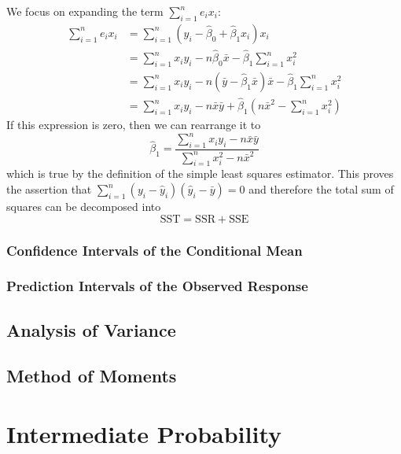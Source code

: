 \documentclass[11pt]{report} %
\begin{document}
We focus on expanding the term $\sum_{i=1}^{n}e_{i}x_{i}$:
\begin{align}
\sum_{i=1}^{n}e_{i}x_{i} &= \sum_{i=1}^{n}\left(y_{i}-\widehat{\beta}_{0}+\widehat{\beta}_{1}x_{i}\right)x_{i} \\
&= \sum_{i=1}^{n}x_{i}y_{i}-n\widehat{\beta}_{0}\bar{x}-\widehat{\beta}_{1}\sum_{i=1}^{n}x_{i}^{2} \\
&= \sum_{i=1}^{n}x_{i}y_{i}-n\left(\bar{y}-\widehat{\beta}_{1}\bar{x}\right)\bar{x}-\widehat{\beta}_{1}\sum_{i=1}^{n}x_{i}^{2} \\
&= \sum_{i=1}^{n}x_{i}y_{i}-n\bar{x}\bar{y}+\widehat{\beta}_{1}\left(n\bar{x}^{2}-\sum_{i=1}^{n}x_{i}^{2}\right)
\end{align}
If this expression is zero, then we can rearrange it to
\begin{equation}
\widehat{\beta}_{1}=\dfrac{\sum_{i=1}^{n}x_{i}y_{i}-n\bar{x}\bar{y}}{\sum_{i=1}^{n}x_{i}^{2}-n\bar{x}^{2}}
\end{equation}
which is true by the definition of the simple least squares estimator. This proves the assertion that $\sum_{i=1}^{n}\left(y_{i}-\widehat{y}_{i}\right)\left(\widehat{y}_{i}-\bar{y}\right) = 0$ and therefore the total sum of squares can be decomposed into
\begin{equation}
\mathrm{SST} = \mathrm{SSR} + \mathrm{SSE}
\end{equation}

\subsection{Confidence Intervals of the Conditional Mean}

\subsection{Prediction Intervals of the Observed Response}

\section{Analysis of Variance}

\section{Method of Moments}

\chapter{Intermediate Probability}
\end{document}

